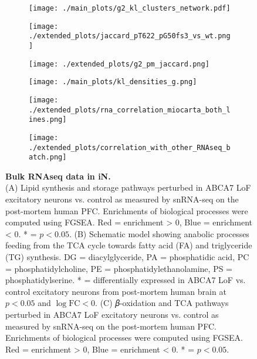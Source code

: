 \begin{figure}[ht]
    \begin{subfigure}[t]{.3\textwidth}
        \caption{}
        \texttt{[image: ./main\_plots/g2\_kl\_clusters\_network.pdf]}        
    \end{subfigure}
    \begin{subfigure}[t]{.3\textwidth}
        \caption{}
        \texttt{[image: ./extended\_plots/jaccard\_pT622\_pG50fs3\_vs\_wt.png]}        
    \end{subfigure}
    \begin{subfigure}[t]{.3\textwidth}
        \caption{}
        \texttt{[image: ./extended\_plots/g2\_pm\_jaccard.png]}        
    \end{subfigure}
    \begin{subfigure}[t]{.3\textwidth}
        \caption{}
        \texttt{[image: ./main\_plots/kl\_densities\_g.png]}        
    \end{subfigure}
    \begin{subfigure}[t]{.3\textwidth}
        \caption{}
        \texttt{[image: ./extended\_plots/rna\_correlation\_miocarta\_both\_lines.png]}        
    \end{subfigure}
    \begin{subfigure}[t]{.3\textwidth}
        \caption{}
        \texttt{[image: ./extended\_plots/correlation\_with\_other\_RNAseq\_batch.png]}        
    \end{subfigure}
    \caption{
        \textbf{Bulk RNAseq data in iN.}\\[1ex]
        (A) Lipid synthesis and storage pathways perturbed in ABCA7 LoF excitatory neurons vs. control as measured by snRNA-seq on the post-mortem human PFC. Enrichments of biological processes were computed using FGSEA. Red = enrichment > 0, Blue = enrichment < 0. * = $p<0.05$. 
        (B) Schematic model showing anabolic processes feeding from the TCA cycle towards fatty acid (FA) and triglyceride (TG) synthesis. DG = diacylglyceride, PA = phosphatidic acid, PC = phosphatidylcholine, PE = phosphatidylethanolamine, PS = phosphatidylserine. * = differentially expressed in ABCA7 LoF vs. control excitatory neurons from post-mortem human brain at $p<0.05$ and $\log\text{FC}<0$. 
        (C) 𝛽-oxidation and TCA pathways perturbed in ABCA7 LoF excitatory neurons vs. control as measured by snRNA-seq on the post-mortem human PFC. Enrichments of biological processes were computed using FGSEA. Red = enrichment > 0, Blue = enrichment < 0. * = $p<0.05$. 
}
\end{figure}

